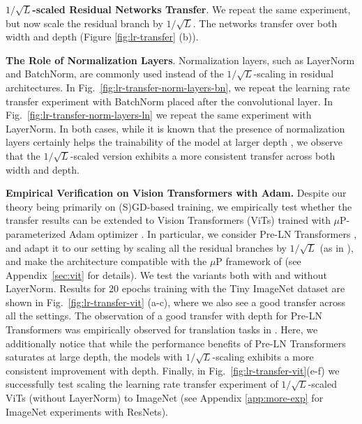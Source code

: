 \documentclass{article} %
\begin{document}
\textbf{$1/\sqrt{L}$-scaled Residual Networks Transfer}. We repeat the same experiment, but now scale the residual branch by ${1}/{\sqrt L}$. The networks transfer over both width and depth (Figure \ref{fig:lr-transfer} (b)).


\textbf{The Role of Normalization Layers}. Normalization layers, such as LayerNorm and BatchNorm, are commonly used instead of the $1/\sqrt{L}$-scaling in residual architectures. In Fig.~\ref{fig:lr-transfer-norm-layers-bn}, we repeat the learning rate transfer experiment with BatchNorm placed after the convolutional layer. In Fig.~\ref{fig:lr-transfer-norm-layers-ln} we repeat the same experiment with LayerNorm. In both cases, while it is known that the presence of normalization layers certainly helps the trainability of the model at larger depth \citep{daneshmand2021batch, joudaki2023impact}, we observe that the $1/\sqrt{L}$-scaled version exhibits a more consistent transfer across both width and depth.


\textbf{Empirical Verification on Vision Transformers with Adam.}
Despite our theory being primarily on (S)GD-based training, we empirically test whether the transfer results can be extended to Vision Transformers (ViTs) trained with $\mu$P-parameterized Adam optimizer \citep{yang2021tuning}. In particular, we consider Pre-LN Transformers \citep{xiong2020layer}, and adapt it to our setting by scaling all the residual branches by $1/\sqrt{L}$ (as in \cite{noci2022signal}), and make the architecture compatible with the $\mu$P framework of \cite{yang2021tuning} (see Appendix~\ref{sec:vit} for details). We test the variants both with and without LayerNorm. Results for 20 epochs training with the Tiny ImageNet dataset are shown in Fig.~\ref{fig:lr-transfer-vit} (a-c), where we also see a good transfer across all the settings. The observation of a good transfer with depth for Pre-LN Transformers was empirically observed for translation tasks in \cite{yang2021tuning}. Here, we additionally notice that while the performance benefits of Pre-LN Transformers saturates at large depth, the models with $1/\sqrt{L}$-scaling exhibits a more consistent improvement with depth. Finally, in Fig.~\ref{fig:lr-transfer-vit}(e-f) we successfully test scaling the learning rate transfer experiment of $1/\sqrt{L}$-scaled ViTs (without LayerNorm) to ImageNet (see Appendix \ref{app:more-exp} for ImageNet experiments with ResNets).
\end{document}
